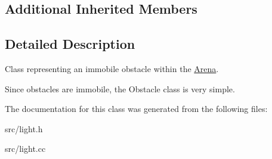 \subsection*{Additional Inherited Members}


\subsection{Detailed Description}
Class representing an immobile obstacle within the \mbox{\hyperlink{class_arena}{Arena}}. 

Since obstacles are immobile, the Obstacle class is very simple. 

The documentation for this class was generated from the following files\+:\begin{DoxyCompactItemize}
\item 
src/light.\+h\item 
src/light.\+cc\end{DoxyCompactItemize}
